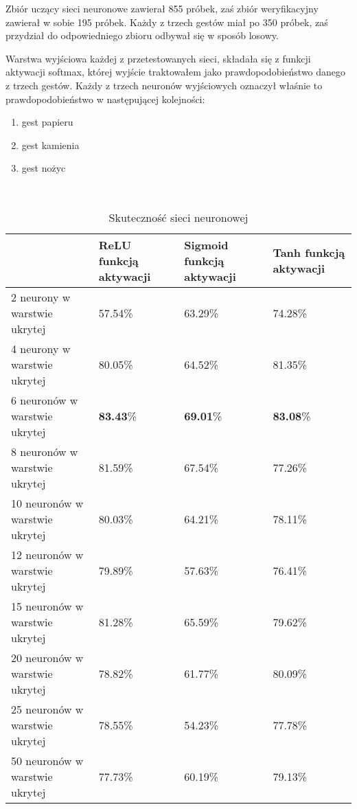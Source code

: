 \documentclass[a4paper,12pt,twoside,openany]{report}
\begin{document}
	Zbiór uczący sieci neuronowe zawierał 855 próbek, zaś zbiór weryfikacyjny zawierał w sobie 195 próbek. Każdy z trzech gestów miał po 350 próbek, zaś przydział do odpowiedniego zbioru odbywał się w sposób losowy.
	
	Warstwa wyjściowa każdej z przetestowanych sieci, składała się z funkcji aktywacji softmax, której wyjście traktowałem jako prawdopodobieństwo danego z trzech gestów. Każdy z trzech neuronów wyjściowych oznaczył właśnie to prawdopodobieństwo w następującej kolejności:
	\begin{enumerate}
		\item gest papieru
		\item gest kamienia
		\item gest nożyc
	\end{enumerate}
	\mbox{}\\
	\begin{table}[H]
		\centering
		\begin{tabularx}{\textwidth}{|X|X|X|X|}
			\hline
			\textbf{} & \textbf{ReLU funkcją aktywacji} & \textbf{Sigmoid funkcją aktywacji}  & \textbf{Tanh funkcją aktywacji}  \\ 
			
			\hline
			2 neurony w warstwie ukrytej & 57.54\% & 63.29\% & 74.28\% \\ 
			
			\hline
			4 neurony w warstwie ukrytej & 80.05\% & 64.52\% & 81.35\% \\
			
			\hline
			6 neuronów w warstwie ukrytej & \textbf{83.43}\% & \textbf{69.01}\% & \textbf{83.08}\% \\
			
			\hline
			8 neuronów w warstwie ukrytej & 81.59\% & 67.54\% & 77.26\% \\
			
			\hline
			10 neuronów w warstwie ukrytej & 80.03\% & 64.21\% & 78.11\% \\
			
			\hline
			12 neuronów w warstwie ukrytej & 79.89\% & 57.63\% & 76.41\% \\
			
			\hline
			15 neuronów w warstwie ukrytej & 81.28\% & 65.59\% & 79.62\% \\
			
			\hline
			20 neuronów w warstwie ukrytej & 78.82\% & 61.77\% & 80.09\% \\
			
			\hline
			25 neuronów w warstwie ukrytej & 78.55\% & 54.23\% & 77.78\% \\
			
			\hline
			50 neuronów w warstwie ukrytej & 77.73\% & 60.19\% & 79.13\% \\ 
			\hline
		\end{tabularx}
		
		\caption{Skuteczność sieci neuronowej}
	\end{table}
\end{document}
